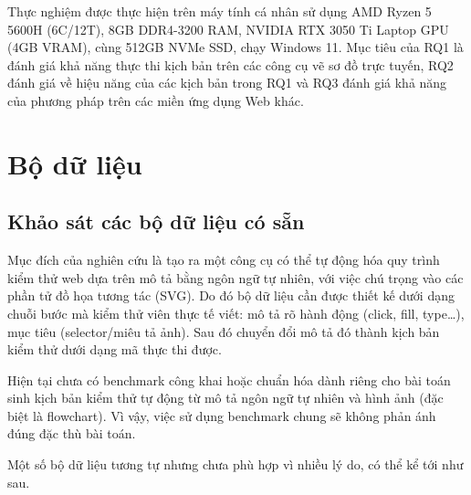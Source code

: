 \documentclass[a4paper, 12pt]{report}
\begin{document}
{\begin{itemize}
    
\end{itemize}

Thực nghiệm được thực hiện trên máy tính cá nhân sử dụng AMD Ryzen 5 5600H (6C/12T), 8GB DDR4-3200 RAM, NVIDIA RTX 3050 Ti Laptop GPU (4GB VRAM), cùng 512GB NVMe SSD, chạy Windows 11. Mục tiêu của RQ1 là đánh giá khả năng thực thi kịch bản trên các công cụ vẽ sơ đồ trực tuyến, RQ2 đánh giá về hiệu năng của các kịch bản trong RQ1 và RQ3 đánh giá khả năng của phương pháp trên các miền ứng dụng Web khác. 







\section{Bộ dữ liệu}
\subsection{Khảo sát các bộ dữ liệu có sẵn}

Mục đích của nghiên cứu là tạo ra một công cụ có thể tự động hóa quy trình kiểm thử web dựa trên mô tả bằng ngôn ngữ tự nhiên, với việc chú trọng vào các phần tử đồ họa tương tác (SVG). Do đó bộ dữ liệu cần được thiết kế dưới dạng chuỗi bước mà kiểm thử viên thực tế viết: mô tả rõ hành động (click, fill, type…), mục tiêu (selector/miêu tả ảnh). Sau đó chuyển đổi mô tả đó thành kịch bản kiểm thử dưới dạng mã thực thi được.


Hiện tại chưa có benchmark công khai hoặc chuẩn hóa dành riêng cho bài toán sinh kịch bản kiểm thử tự động từ mô tả ngôn ngữ tự nhiên và hình ảnh (đặc biệt là flowchart). Vì vậy, việc sử dụng benchmark chung sẽ không phản ánh đúng đặc thù bài toán.


Một số bộ dữ liệu tương tự nhưng chưa phù hợp vì nhiều lý do, có thể kể tới như sau.


}
\end{document}
